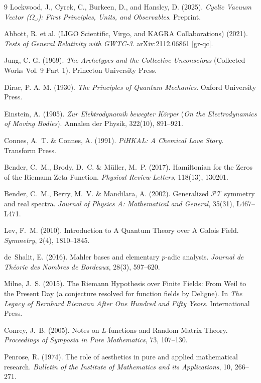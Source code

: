 \begin{thebibliography}{9}
Lockwood, J., Cyrek, C., Burkeen, D., and Hansley, D. (2025).
\textit{Cyclic Vacuum Vector ($\Omega_\omega$): First Principles, Units, and Observables}.
Preprint.

Abbott, R. et al. (LIGO Scientific, Virgo, and KAGRA Collaborations) (2021).
\textit{Tests of General Relativity with GWTC-3}.
arXiv:2112.06861 [gr-qc].

Jung, C. G. (1969).
\textit{The Archetypes and the Collective Unconscious} (Collected Works Vol. 9 Part 1).
Princeton University Press.

Dirac, P. A. M. (1930).
\textit{The Principles of Quantum Mechanics}.
Oxford University Press.

Einstein, A. (1905).
\textit{Zur Elektrodynamik bewegter Körper} (\textit{On the Electrodynamics of Moving Bodies}).
Annalen der Physik, 322(10), 891--921.

Connes, A.~T. \& Connes, A. (1991).
\textit{PiHKAL: A Chemical Love Story}.
Transform Press.

Bender, C.~M., Brody, D.~C. \& M\"uller, M.~P. (2017).
Hamiltonian for the Zeros of the Riemann Zeta Function.
\textit{Physical Review Letters}, 118(13), 130201.

Bender, C.~M., Berry, M.~V. \& Mandilara, A. (2002).
Generalized $\mathcal{PT}$ symmetry and real spectra.
\textit{Journal of Physics A: Mathematical and General}, 35(31), L467--L471.

Lev, F.~M. (2010).
Introduction to A Quantum Theory over A Galois Field.
\textit{Symmetry}, 2(4), 1810--1845.

de~Shalit, E. (2016).
Mahler bases and elementary $p$-adic analysis.
\textit{Journal de Th\'eorie des Nombres de Bordeaux}, 28(3), 597--620.

Milne, J.~S. (2015).
The Riemann Hypothesis over Finite Fields: From Weil to the Present Day (a conjecture resolved for function fields by Deligne).
In \textit{The Legacy of Bernhard Riemann After One Hundred and Fifty Years}. International Press.

Conrey, J.~B. (2005).
Notes on $L$-functions and Random Matrix Theory.
\textit{Proceedings of Symposia in Pure Mathematics}, 73, 107--130.

Penrose, R. (1974).
The role of aesthetics in pure and applied mathematical research.
\textit{Bulletin of the Institute of Mathematics and its Applications}, 10, 266--271.


\end{thebibliography}
